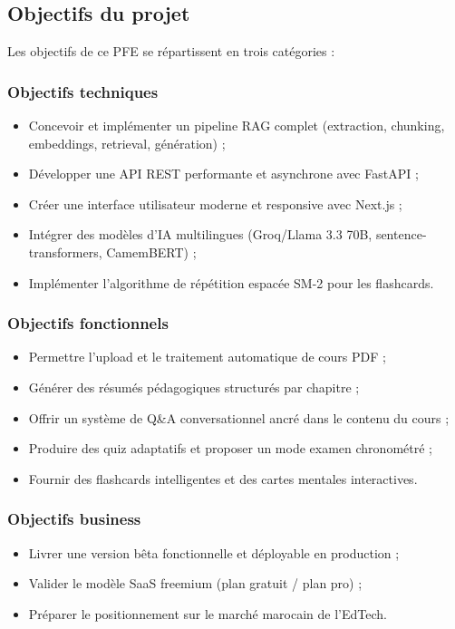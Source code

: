 \subsection{Objectifs du projet}

Les objectifs de ce PFE se répartissent en trois catégories :

\subsubsection{Objectifs techniques}
\begin{itemize}
  \item Concevoir et implémenter un pipeline RAG complet (extraction, chunking, embeddings, retrieval, génération) ;
  \item Développer une API REST performante et asynchrone avec FastAPI ;
  \item Créer une interface utilisateur moderne et responsive avec Next.js ;
  \item Intégrer des modèles d'IA multilingues (Groq/Llama 3.3 70B, sentence-transformers, CamemBERT) ;
  \item Implémenter l'algorithme de répétition espacée SM-2 pour les flashcards.
\end{itemize}

\subsubsection{Objectifs fonctionnels}
\begin{itemize}
  \item Permettre l'upload et le traitement automatique de cours PDF ;
  \item Générer des résumés pédagogiques structurés par chapitre ;
  \item Offrir un système de Q\&A conversationnel ancré dans le contenu du cours ;
  \item Produire des quiz adaptatifs et proposer un mode examen chronométré ;
  \item Fournir des flashcards intelligentes et des cartes mentales interactives.
\end{itemize}

\subsubsection{Objectifs business}
\begin{itemize}
  \item Livrer une version bêta fonctionnelle et déployable en production ;
  \item Valider le modèle SaaS freemium (plan gratuit / plan pro) ;
  \item Préparer le positionnement sur le marché marocain de l'EdTech.
\end{itemize}

